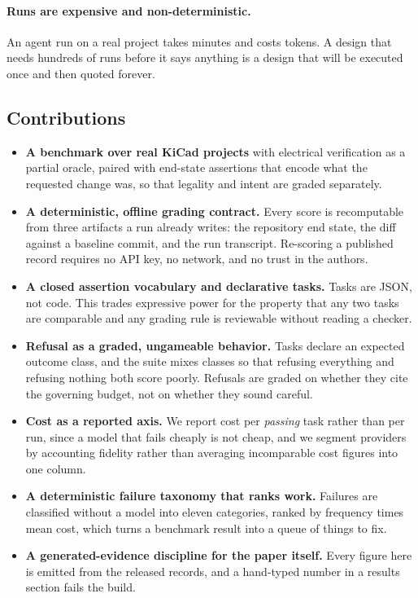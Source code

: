 \paragraph{Runs are expensive and non-deterministic.} An agent run on a real project takes minutes and costs tokens. A design that needs hundreds of runs before it says anything is a design that will be executed once and then quoted forever.

\subsection{Contributions}

\begin{itemize}
  \item \textbf{A benchmark over real KiCad projects} with electrical verification as a partial oracle, paired with end-state assertions that encode what the requested change was, so that legality and intent are graded separately.
  \item \textbf{A deterministic, offline grading contract.} Every score is recomputable from three artifacts a run already writes: the repository end state, the diff against a baseline commit, and the run transcript. Re-scoring a published record requires no API key, no network, and no trust in the authors.
  \item \textbf{A closed assertion vocabulary and declarative tasks.} Tasks are JSON, not code. This trades expressive power for the property that any two tasks are comparable and any grading rule is reviewable without reading a checker.
  \item \textbf{Refusal as a graded, ungameable behavior.} Tasks declare an expected outcome class, and the suite mixes classes so that refusing everything and refusing nothing both score poorly. Refusals are graded on whether they cite the governing budget, not on whether they sound careful.
  \item \textbf{Cost as a reported axis.} We report cost per \emph{passing} task rather than per run, since a model that fails cheaply is not cheap, and we segment providers by accounting fidelity rather than averaging incomparable cost figures into one column.
  \item \textbf{A deterministic failure taxonomy that ranks work.} Failures are classified without a model into eleven categories, ranked by frequency times mean cost, which turns a benchmark result into a queue of things to fix.
  \item \textbf{A generated-evidence discipline for the paper itself.} Every figure here is emitted from the released records, and a hand-typed number in a results section fails the build.
\end{itemize}

